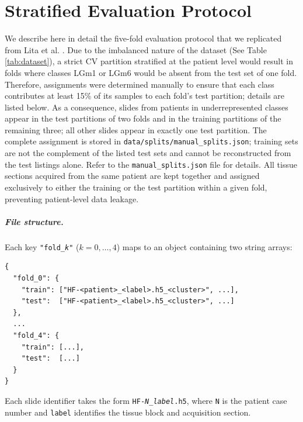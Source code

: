 \newpage


\chapter{Stratified Evaluation Protocol}
\label{app:cv_schema}
\setcounter{table}{0}
\renewcommand{\thetable}{\Alph{chapter}.\arabic{table}}

We describe here in detail the five-fold evaluation protocol that we replicated from Lita et al. \cite{apollonov2024raman}. Due to the imbalanced nature of the dataset (See Table \ref{tab:dataset}), a strict CV partition stratified at the patient level would result in folds where classes LGm1 or LGm6 would be absent from the test set of one fold. Therefore, assignments were determined manually to ensure that each class contributes at least 15\% of its samples to each fold's test partition; details are listed below. As a consequence, slides from patients in underrepresented classes appear in the test partitions of two folds and in the training partitions of the remaining three; all other slides appear in exactly one test partition. The complete assignment is stored in \texttt{data/splits/manual\_splits.json}; training sets are not the complement of the listed test sets and cannot be reconstructed from the test listings alone. Refer to the \texttt{manual\_splits.json} file for details.
  All tissue sections acquired from the same patient are kept together and assigned exclusively to either the training or the test partition within a given fold, preventing patient-level data leakage.

\paragraph{File structure.} Each key \texttt{"fold\_\textit{k}"} ($k = 0, \ldots, 4$) maps to an object containing two string arrays:

\begin{verbatim}
{
  "fold_0": {
    "train": ["HF-<patient>_<label>.h5_<cluster>", ...],
    "test":  ["HF-<patient>_<label>.h5_<cluster>", ...]
  },
  ...
  "fold_4": {
    "train": [...],
    "test":  [...]
  }
}
\end{verbatim}

Each slide identifier takes the form \texttt{HF-\textit{N}\_\textit{label}.h5}, where \texttt{N} is the patient case number and \texttt{label} identifies the tissue block and acquisition section.

